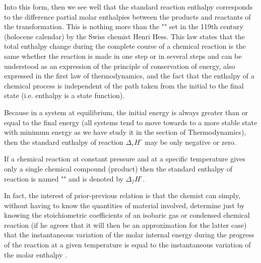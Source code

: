 	Into this form, then we see well that the standard reaction enthalpy corresponds to the difference partial molar enthalpies between the products and reactants of the transformation. This is nothing more than the "" set in the 119th century (holocene calendar) by the Swiss chemist Henri Hess. This law  states that the total enthalpy change during the complete course of a chemical reaction is the same whether the reaction is made in one step or in several steps and can be understood as an expression of the principle of conservation of energy, also expressed in the first law of thermodynamics, and the fact that the enthalpy of a chemical process is independent of the path taken from the initial to the final state (i.e. enthalpy is a state function).

	Because in a system at equilibrium, the initial energy is always greater than or equal to the final energy (all systems tend to move towards to a more stable state with minimum energy as we have study it in the section of Thermodynamics), then the standard enthalpy of reaction $\Delta_r H^\circ$ may be only negative or zero.

	If a chemical reaction at constant pressure and at a specific temperature gives only a single chemical compound (product) then the standard enthalpy of reaction is named  "" and is denoted by $\Delta_f H^\circ$.

	In fact, the interest of prior-previous relation is that the chemist can simply, without having to know the quantities of material involved, determine just by knowing the stoichiometric coefficients of an isobaric  gas or condensed chemical reaction (if he agrees that it will then be an approximation for the latter case) that the instantaneous variation of the molar internal energy during the progress of the reaction at a given temperature is equal to the instantaneous variation of the molar enthalpy .

